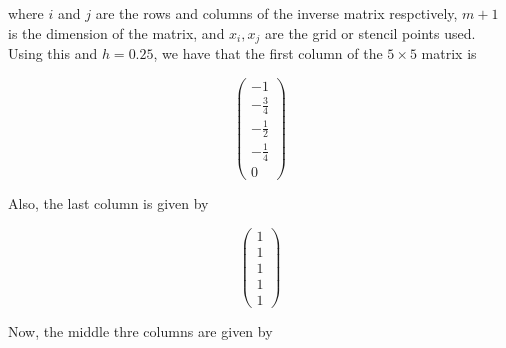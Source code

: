 \begin{solution}
    where $i$ and $j$ are the rows and columns of the inverse matrix respctively, $m+1$ is the dimension
    of the matrix, and $x_i,x_j$ are the grid or stencil points used. Using this and $h=0.25$, we have
    that the first column of the $5\times5$ matrix is
    
    $$\left(\begin{array}{c} -1\\ -\frac{3}{4} \\ -\frac12 \\ -\frac14 \\ 0 \end{array}\right)$$
    
    Also, the last column is given by
    
    $$\left(\begin{array}{c} 1\\ 1 \\ 1 \\ 1 \\ 1 \end{array}\right)$$
    
    Now, the middle thre columns are given by
    

\end{solution}
